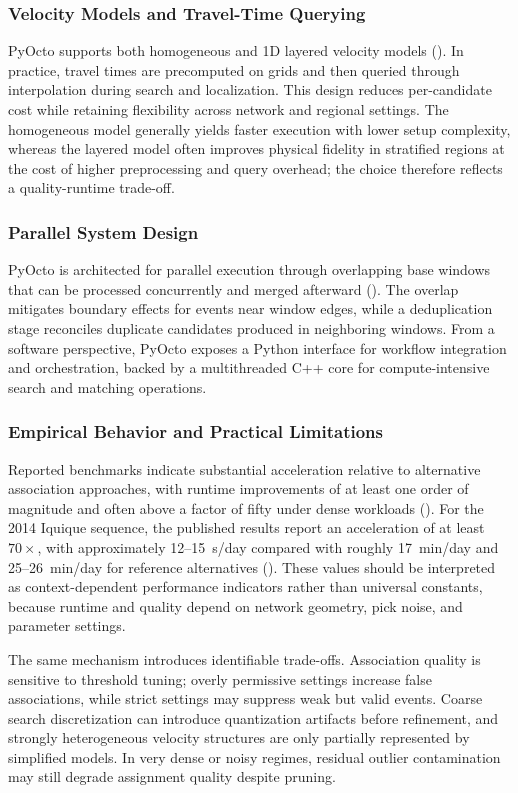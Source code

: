 \subsubsection{Velocity Models and Travel-Time Querying}
PyOcto supports both homogeneous and 1D layered velocity models
(\cite{PyOcto}). In practice, travel times are precomputed on grids and then
queried through interpolation during search and localization. This design
reduces per-candidate cost while retaining flexibility across network and
regional settings. The homogeneous model generally yields faster execution with
lower setup complexity, whereas the layered model often improves physical
fidelity in stratified regions at the cost of higher preprocessing and query
overhead; the choice therefore reflects a quality-runtime trade-off.

\subsubsection{Parallel System Design}
PyOcto is architected for parallel execution through overlapping base windows
that can be processed concurrently and merged afterward (\cite{PyOcto}). The
overlap mitigates boundary effects for events near window edges, while a
deduplication stage reconciles duplicate candidates produced in neighboring
windows. From a software perspective, PyOcto exposes a Python interface for
workflow integration and orchestration, backed by a multithreaded C++ core for
compute-intensive search and matching operations.

\subsubsection{Empirical Behavior and Practical Limitations}
Reported benchmarks indicate substantial acceleration relative to alternative
association approaches, with runtime improvements of at least one order of
magnitude and often above a factor of fifty under dense workloads
(\cite{PyOcto}). For the 2014 Iquique sequence, the published results report
an acceleration of at least $70\times$, with approximately 12--15~s/day
compared with roughly 17~min/day and 25--26~min/day for reference alternatives
(\cite{PyOcto}). These values should be interpreted as context-dependent
performance indicators rather than universal constants, because runtime and
quality depend on network geometry, pick noise, and parameter settings.

The same mechanism introduces identifiable trade-offs. Association quality is
sensitive to threshold tuning; overly permissive settings increase false
associations, while strict settings may suppress weak but valid events. Coarse
search discretization can introduce quantization artifacts before refinement,
and strongly heterogeneous velocity structures are only partially represented
by simplified models. In very dense or noisy regimes, residual outlier
contamination may still degrade assignment quality despite pruning.


